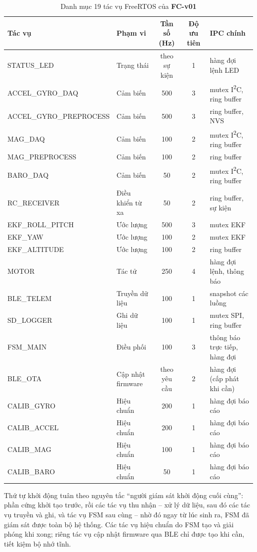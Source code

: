\begin{table}[h]
\centering
\caption{Danh mục 19 tác vụ FreeRTOS của \textbf{FC-v01}}
\label{tab:tasks}
\footnotesize
\setlength{\tabcolsep}{4pt}
\begin{tabular}{p{3.9cm}p{2.8cm}ccp{3.9cm}}
\toprule
Tác vụ & Phạm vi & Tần số (Hz) & Độ ưu tiên & IPC chính \\
\midrule
STATUS\_LED & Trạng thái & theo sự kiện & 1 & hàng đợi lệnh LED \\
ACCEL\_GYRO\_DAQ & Cảm biến & 500 & 3 & mutex I\textsuperscript{2}C, ring buffer \\
ACCEL\_\allowbreak GYRO\_\allowbreak PREPROCESS & Cảm biến & 500 & 3 & ring buffer, NVS \\
MAG\_DAQ & Cảm biến & 100 & 2 & mutex I\textsuperscript{2}C, ring buffer \\
MAG\_PREPROCESS & Cảm biến & 100 & 2 & ring buffer \\
BARO\_DAQ & Cảm biến & 50 & 2 & mutex I\textsuperscript{2}C, ring buffer \\
RC\_RECEIVER & Điều khiển từ xa & 50 & 2 & ring buffer, sự kiện \\
EKF\_ROLL\_PITCH & Ước lượng & 500 & 3 & mutex EKF \\
EKF\_YAW & Ước lượng & 100 & 2 & mutex EKF \\
EKF\_ALTITUDE & Ước lượng & 100 & 2 & ring buffer \\
MOTOR & Tác tử & 250 & 4 & hàng đợi lệnh, thông báo \\
BLE\_TELEM & Truyền dữ liệu & 100 & 1 & snapshot các luồng \\
SD\_LOGGER & Ghi dữ liệu & 100 & 1 & mutex SPI, ring buffer \\
FSM\_MAIN & Điều phối & 100 & 3 & thông báo trực tiếp, hàng đợi \\
BLE\_OTA & Cập nhật firmware & theo yêu cầu & 2 & hàng đợi (cấp phát khi cần) \\
CALIB\_GYRO & Hiệu chuẩn & 200 & 1 & hàng đợi báo cáo \\
CALIB\_ACCEL & Hiệu chuẩn & 200 & 1 & hàng đợi báo cáo \\
CALIB\_MAG & Hiệu chuẩn & 100 & 1 & hàng đợi báo cáo \\
CALIB\_BARO & Hiệu chuẩn & 50 & 1 & hàng đợi báo cáo \\
\bottomrule
\end{tabular}
\end{table}

Thứ tự khởi động tuân theo nguyên tắc ``người giám sát khởi động cuối cùng'': phần cứng khởi tạo trước, rồi các tác vụ thu nhận -- xử lý dữ liệu, sau đó các tác vụ truyền và ghi, và tác vụ FSM sau cùng -- nhờ đó ngay từ lúc sinh ra, FSM đã giám sát được toàn bộ hệ thống. Các tác vụ hiệu chuẩn do FSM tạo và giải phóng khi xong; riêng tác vụ cập nhật firmware qua BLE chỉ được tạo khi cần, tiết kiệm bộ nhớ tĩnh.

